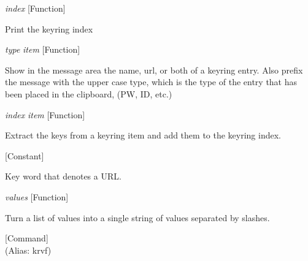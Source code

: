 \vspace{1em}
\noindent
{}
\usebox{\funcname}\emph{index}
 \hfill [Function]

\begin{doc-string}
Print the keyring index
\end{doc-string}

\vspace{1em}
\noindent
{}
\usebox{\funcname}\emph{type} \emph{item}
 \hfill [Function]

\begin{doc-string}
Show in the message area the name, url, or both of a keyring entry.  Also prefix
the message with the upper case type, which is the type of the entry that has been
placed in the clipboard, (PW, ID, etc.)
\end{doc-string}

\vspace{1em}
\noindent
{}
\usebox{\funcname}\emph{index} \emph{item}
 \hfill [Function]

\begin{doc-string}
Extract the keys from a keyring item and add them to the keyring index.
\end{doc-string}

\vspace{1em}
\noindent
{}
\usebox{\funcname}
 \hfill [Constant]

\begin{doc-string}
Key word that denotes a URL.
\end{doc-string}

\vspace{1em}
\noindent
{}
\usebox{\funcname}\emph{values}
 \hfill [Function]

\begin{doc-string}
Turn a list of values into a single string of values separated by slashes.
\end{doc-string}

\vspace{1em}
\noindent
{}
\usebox{\funcname}
 \hfill [Command]\\%
 (Alias: krvf)

